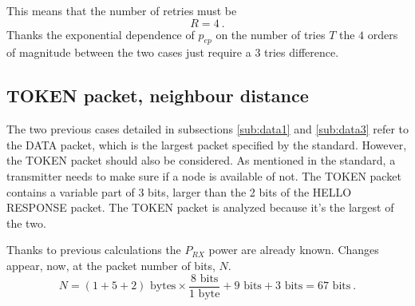 This means that the number of retries must be
\begin{equation}
	R = 4 \ .
\end{equation}
Thanks the exponential dependence of $p_{ep}$ on the number of tries $T$ the $4$ orders of magnitude between the two cases just require a $3$ tries difference.



\subsection{TOKEN packet, neighbour distance} \label{sub:token1}
The two previous cases detailed in subsections \ref{sub:data1} and \ref{sub:data3} refer to the DATA packet, which is the largest packet specified by the standard. However, the TOKEN packet should also be considered. As mentioned in the standard, a transmitter needs to make sure if a node is available of not. The TOKEN packet contains a variable part of \SI{3}{} bits, larger than the \SI{2}{} bits of the HELLO RESPONSE packet. The TOKEN packet is analyzed because it's the largest of the two.

Thanks to previous calculations the $P_{RX}$ power are already known. Changes appear, now, at the packet number of bits, $N$.
\begin{equation}
	N = \left( 1 + 5 + 2  \right)  \text{ bytes} \times \frac{8 \text{ bits}}{1 \text{ byte}} + 9 \text{ bits} + 3 \text{ bits} = 67 \text{ bits} \ .
\end{equation}


